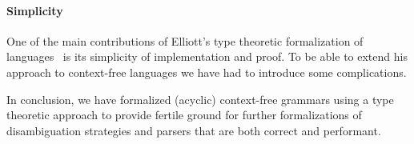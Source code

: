\paragraph{Simplicity}
One of the main contributions of Elliott's type theoretic formalization of languages~\cite{conal-languages} is its simplicity of implementation and proof. To be able to extend his approach to context-free languages we have had to introduce some complications.
\medbreak

In conclusion, we have formalized (acyclic) context-free grammars using a type theoretic approach to provide fertile ground for further formalizations of disambiguation strategies and parsers that are both correct and performant.
